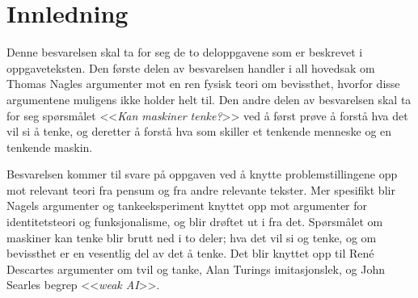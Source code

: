 \section{Innledning}

Denne besvarelsen skal ta for seg de to deloppgavene som er beskrevet i oppgaveteksten. 
Den første delen av besvarelsen handler i all hovedsak om Thomas Nagles argumenter mot en ren fysisk teori om bevissthet, hvorfor disse argumentene muligens ikke holder helt til.
Den andre delen av besvarelsen skal ta for seg spørsmålet <<\textit{Kan maskiner tenke?}>> ved å først prøve å forstå hva det vil si å tenke, og deretter å forstå hva som skiller et tenkende menneske og en tenkende maskin. 

Besvarelsen kommer til svare på oppgaven ved å knytte problemstillingene opp mot relevant teori fra pensum og fra andre relevante tekster. Mer spesifikt blir Nagels argumenter og tankeeksperiment knyttet opp mot argumenter for identitetsteori og funksjonalisme, og blir drøftet ut i fra det. Spørsmålet om maskiner kan tenke blir brutt ned i to deler; hva det vil si og tenke, og om bevissthet er en vesentlig del av det å tenke. Det blir knyttet opp til René Descartes argumenter om tvil og tanke, Alan Turings imitasjonslek, og John Searles begrep <<\textit{weak AI}>>.